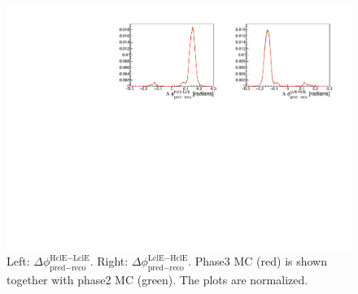 \documentclass[a4paper,11pt,twosided,final,german,openbib,pdftex,listof=totoc,bibliography=totoc]{scrbook}
\begin{document}
\begin{appendix}
\begin{figure}[h!]
	\centering
	\includegraphics[width=\textwidth]{Plots/comp/cb2bMC.pdf}
	\caption[Normalized b2bClusterPhi - clusterPhi For Phase2 And Phase3 MC]{Left: $\Delta \phi _{\textrm{pred} - \textrm{reco}}^{\textrm{HclE}-\textrm{LclE}}$. Right:  $\Delta \phi _{\textrm{pred} - \textrm{reco}}^{\textrm{LclE}-\textrm{HclE}}$. Phase3 MC (red) is shown together with phase2 MC (green). The plots are normalized.}
	\label{fig:Cb2bMC}
\end{figure}

\end{appendix}
\end{document}
